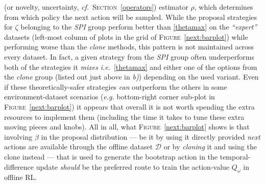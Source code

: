(or novelty, uncertainty, \textit{cf.}~\textsc{Section}~\ref{operators}) estimator $\rho$,
which determines from which policy the next action will be sampled.
While the proposal strategies for $\zeta$ belonging to the \textit{SPI} group perform better than
\ref{thetamax} on the \textit{``expert''} datasets (left-most column of plots
in the grid of \textsc{Figure}~\ref{next:barplot}) while performing worse than the \textit{clone} methods,
this pattern is not maintained across every dataset.
In fact, a given strategy from the \textit{SPI} group often underperforms both of the strategies it \emph{mixes}
\textit{i.e.}~\ref{thetamax} and either one of the options from the \textit{clone} group
(listed out just above in \textit{b)})
depending on the used variant.
Even if these theoretically-safer strategies
\emph{can} outperform the others in some environment-dataset scenarios
(\textit{e.g.} bottom-right corner sub-plot in \textsc{Figure}~\ref{next:barplot})
it appears that overall it is not worth spending the extra resources to implement them
(including the time it takes to tune these extra moving pieces and knobs).
All in all, what \textsc{Figure}~\ref{next:barplot} shows is that involving $\beta$ in the proposal distribution
--- be it by using it directly provided \textit{next} actions are available through the offline dataset $\mathcal{D}$
or by \emph{cloning} it and using the clone instead ---
that is used to generate the bootstrap action in the temporal-difference update
\emph{should} be the preferred route to train the action-value $Q_\omega$ in offline RL.

